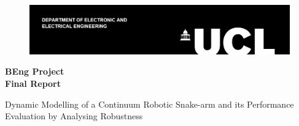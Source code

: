 \documentclass[a4paper,12pt]{report}
\author{Arundathi Shaji Shanthini}
\begin{document}
\begin{titlepage}
    \noindent \noindent
	\begin{figure}[t]
		\vspace{-1.8in}
		\hspace{-1.5in}
		\includegraphics[width=1.55\textwidth]{images/Coversheet_Header_black_with_text.png}
	\end{figure}
   
    \vspace{15mm}

    \begin{center}
        {\LARGE \textbf{BEng Project}}\\
        \vspace{4mm}
        {\Huge \textbf{Final Report}}
    \end{center}
    
    \vspace{10mm}
    
    \begin{center}
    \begin{spacing}{1.8}
    {\LARGE
   Dynamic Modelling of a Continuum Robotic Snake-arm and its Performance Evaluation by Analysing Robustness}
    \end{spacing}
    
    
   \vspace{25mm}
    
    \begingroup
    \renewcommand{\arraystretch}{1.3}
    

\end{center}
\end{titlepage}
\end{document}
